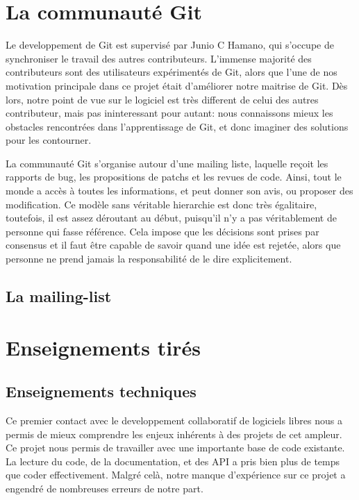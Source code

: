 \documentclass[a4paper, 12pt]{article}
\begin{document}
\section{La communauté Git}

Le developpement de Git est supervisé par Junio C Hamano, qui s'occupe de synchroniser le travail des autres contributeurs.
L'immense majorité des contributeurs sont des utilisateurs expérimentés de Git, alors que l'une de nos motivation principale dans ce projet était d'améliorer notre maitrise de Git.
Dès lors, notre point de vue sur le logiciel est très different de celui des autres contributeur, mais pas ininteressant pour autant: nous connaissons mieux les obstacles rencontrées dans l'apprentissage de Git, et donc imaginer des solutions pour les contourner.

La communauté Git s'organise autour d'une mailing liste, laquelle reçoit les rapports de bug, les propositions de patchs et les revues de code. Ainsi, tout le monde a accès à toutes les informations, et peut donner son avis, ou proposer des modification.
Ce modèle sans véritable hierarchie est donc très égalitaire, toutefois, il est assez déroutant au début, puisqu'il n'y a pas véritablement de personne qui fasse référence.
Cela impose que les décisions sont prises par consensus et il faut être capable de savoir quand une idée est rejetée, alors que personne ne prend jamais la responsabilité de le dire explicitement.

\subsection{La mailing-list}




\section{Enseignements tirés}

\subsection{Enseignements techniques}

Ce premier contact avec le developpement collaboratif de logiciels libres nous a permis de mieux comprendre les enjeux inhérents à des projets de cet ampleur. 
Ce projet nous permis de travailler avec une importante base de code existante. La lecture du code, de la documentation, et des API a pris bien plus de temps que coder effectivement. Malgré celà, notre manque d'expérience sur ce projet a engendré de nombreuses erreurs de notre part. 
\end{document}

